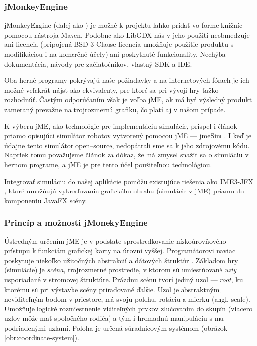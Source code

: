 \subsubsection{jMonkeyEngine}
\label{subsub:jMonekyEngine}
jMonkeyEngine (ďalej ako ) je možné k projektu ľahko pridať vo forme knižníc pomocou nástroja Maven. Podobne ako LibGDX nás v jeho použití neobmedzuje ani licencia (pripojená BSD 3-Clause licencia umožňuje použitie produktu s modifikáciou i na komerčné účely) ani poskytnuté funkcionality. Nechýba dokumentácia, návody pre začiatočníkov, vlastný SDK a IDE.

Oba herné programy pokrývajú naše požiadavky a na internetových fórach je ich možné veľakrát nájsť ako ekvivalenty, pre ktoré sa pri vývoji hry ťažko rozhodnúť. Častým odporúčaním však je voľba jME, ak má byť výsledný produkt zameraný prevažne na trojrozmernú grafiku, čo platí aj v našom prípade.

K výberu jME, ako technológie pre implementáciu simulácie, prispel i článok priamo opisujúci simulátor robotov vytvorený pomocou jME --- jmeSim \cite{jmeSim}. I keď je údajne tento simulátor open--source, nedopátrali sme sa k jeho zdrojovému kódu. Napriek tomu považujeme článok za dôkaz, že má zmysel snažiť sa o simuláciu v hernom programe, a jME je pre tento účel použiteľnou technológiou.

Integrovať simuláciu do našej aplikácie pomôžu existujúce riešenia ako JME3-JFX \cite{jmejfx}, ktoré umožňujú vykresľovanie grafického obsahu (simulácie v jME) priamo do komponentu JavaFX scény.

\subsubsection{Princíp a možnosti jMonekyEngine}
Ústredným určením jME je v podstate sprostredkovanie nízkoúrovňového prístupu k funkciám grafickej karty na úrovni vyššej. Programátorovi naviac poskytuje niekoľko užitočných abstrakcií a dátových štruktúr \cite{jmeDocumentation}. Základom hry (simulácie) je \textit{scéna}, trojrozmerné prostredie, v ktorom sú umiestňované \textit{uzly} usporiadané v stromovej štruktúre. Prázdnu scénu tvorí jediný uzol --- \textit{root}, ku ktorému sú pri výstavbe scény priraďované ďalšie. Uzol je abstraktným, neviditeľným bodom v priestore, má svoju polohu, rotáciu a mierku (angl. scale). Umožňuje logické rozmiestnenie viditeľných prvkov zlučovaním do skupín (viacero uzlov môže mať spoločného rodiča) a tým i hromadnú manipuláciu s mu podriadenými uzlami. Poloha je určená súradnicovým systémom (obrázok \ref{obr:coordinate-system}).

